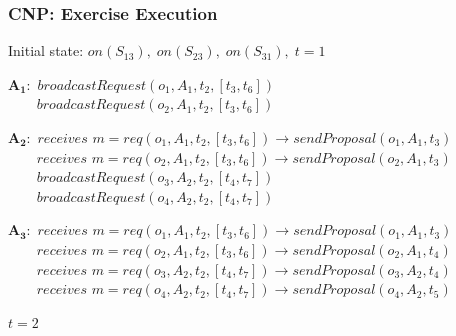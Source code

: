 \begin{frame}
	\frametitle{CNP: Exercise Execution}
	
	Initial state: $ on(S_{13}), \; on(S_{23}), \; on(S_{31}), \; t = 1 $ \\
	
	\vspace{0.4cm}
	
	$ \mathbf{A_1:} $ $ broadcastRequest(o_1,A_1,t_2,[t_3,t_6]) $ \\
	$ \;\;\;\;\;\,\,\,\, broadcastRequest(o_2,A_1,t_2,[t_3,t_6]) $ \\
	
	\vspace{0.1cm}
	
	$ \mathbf{A_2:} $ $ receives $ $ m = req(o_1,A_1,t_2,[t_3,t_6]) \rightarrow sendProposal(o_1,A_1,t_3) $ \\
	$ \;\;\;\;\;\,\,\,\, receives $ $ m = req(o_2,A_1,t_2,[t_3,t_6]) \rightarrow sendProposal(o_2,A_1,t_3) $ \\
	$ \;\;\;\;\;\,\,\,\, broadcastRequest(o_3,A_2,t_2,[t_4,t_7]) $ \\
	$ \;\;\;\;\;\,\,\,\, broadcastRequest(o_4,A_2,t_2,[t_4,t_7]) $ \\
	
	\vspace{0.1cm}
	
	$ \mathbf{A_3:} $ $ receives $ $ m = req(o_1,A_1,t_2,[t_3,t_6]) \rightarrow sendProposal(o_1,A_1,t_3) $ \\
	$ \;\;\;\;\;\,\,\,\, receives $ $ m = req(o_2,A_1,t_2,[t_3,t_6]) \rightarrow sendProposal(o_2,A_1,t_4) $ \\
	$ \;\;\;\;\;\,\,\,\, receives $ $ m = req(o_3,A_2,t_2,[t_4,t_7]) \rightarrow sendProposal(o_3,A_2,t_4) $ \\
	$ \;\;\;\;\;\,\,\,\, receives $ $ m = req(o_4,A_2,t_2,[t_4,t_7]) \rightarrow sendProposal(o_4,A_2,t_5) $ \\
	
	\vspace{0.1cm}
	
	$ t = 2 $ \\
\end{frame}

